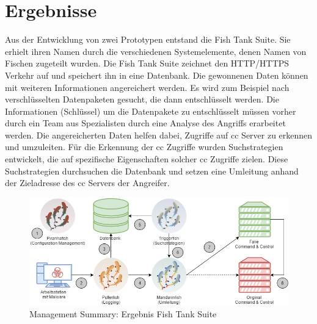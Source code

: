 \section{Ergebnisse}
Aus der Entwicklung von zwei Prototypen entstand die Fish Tank Suite. Sie erhielt ihren Namen durch die verschiedenen Systemelemente, denen Namen von Fischen zugeteilt wurden. Die Fish Tank Suite zeichnet den HTTP/HTTPS Verkehr auf und speichert ihn in eine Datenbank. Die gewonnenen Daten können mit weiteren Informationen angereichert werden. Es wird zum Beispiel nach verschlüsselten Datenpaketen gesucht, die dann entschlüsselt werden. Die Informationen (Schlüssel) um die Datenpakete zu entschlüsselt müssen vorher durch ein Team aus Spezialisten durch eine Analyse des Angriffs erarbeitet werden. Die angereicherten Daten helfen dabei, Zugriffe auf \gls{cc} Server zu erkennen und umzuleiten. Für die Erkennung der \gls{cc} Zugriffe wurden Suchstrategien entwickelt, die auf spezifische Eigenschaften solcher \gls{cc} Zugriffe zielen.  Diese Suchstrategien durchsuchen die Datenbank und setzen eine Umleitung anhand der Zieladresse des \gls{cc} Servers der Angreifer.

\begin{figure}[H]
	\centering
	\includegraphics[width=\textwidth]{img/MS-FTS.png}
	\caption{Management Summary: Ergebnis Fish Tank Suite}
	\label{fig:ergebnis_fish_tank_suite}
\end{figure}

